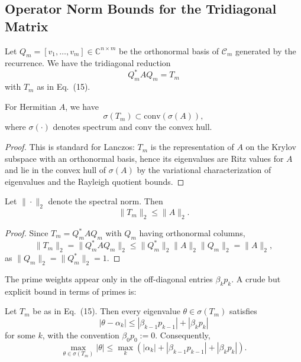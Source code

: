 \documentclass[11pt]{article}
\begin{document}
\subsection{Operator Norm Bounds for the Tridiagonal Matrix}

Let $Q_m=[v_1,\dots,v_m]\in\mathbb{C}^{n\times m}$ be the orthonormal
basis of $\mathcal{C}_m$ generated by the recurrence. We have the
tridiagonal reduction
\begin{equation}
Q_m^* A Q_m = T_m
\end{equation}
with $T_m$ as in Eq.~(15).\cite{PrimeEigenSolvers,LanczosTour}

\begin{lemma}
For Hermitian $A$, we have
\[
\sigma(T_m)\subset \mathrm{conv}(\sigma(A)),
\]
where $\sigma(\cdot)$ denotes spectrum and $\mathrm{conv}$ the convex
hull.
\end{lemma}

\begin{proof}
This is standard for Lanczos: $T_m$ is the representation of $A$ on the
Krylov subspace with an orthonormal basis, hence its eigenvalues are
Ritz values for $A$ and lie in the convex hull of $\sigma(A)$ by the
variational characterization of eigenvalues and the Rayleigh quotient
bounds.\cite{LanczosAlgo,WikiLanczos}
\end{proof}

\begin{lemma}
Let $\|\cdot\|_2$ denote the spectral norm. Then
\[
\|T_m\|_2 \le \|A\|_2.
\]
\end{lemma}

\begin{proof}
Since $T_m = Q_m^* A Q_m$ with $Q_m$ having orthonormal columns,
\[
\|T_m\|_2 = \|Q_m^* A Q_m\|_2 \le \|Q_m^*\|_2 \|A\|_2 \|Q_m\|_2
= \|A\|_2,
\]
as $\|Q_m\|_2 = \|Q_m^*\|_2 = 1$.\cite{LanczosAlgo}
\end{proof}

The prime weights appear only in the off-diagonal entries
$\beta_k p_k$. A crude but explicit bound in terms of primes is:

\begin{proposition}
Let $T_m$ be as in Eq.~(15). Then every eigenvalue $\theta\in\sigma(T_m)$
satisfies
\[
|\theta - \alpha_k|\le |\beta_{k-1} p_{k-1}| + |\beta_k p_k|
\]
for some $k$, with the convention $\beta_0 p_0 := 0$. Consequently,
\[
\max_{\theta\in\sigma(T_m)} |\theta|
\le \max_k \left( |\alpha_k|+|\beta_{k-1} p_{k-1}|+|\beta_k p_k| \right).
\]
\end{proposition}
\end{document}
